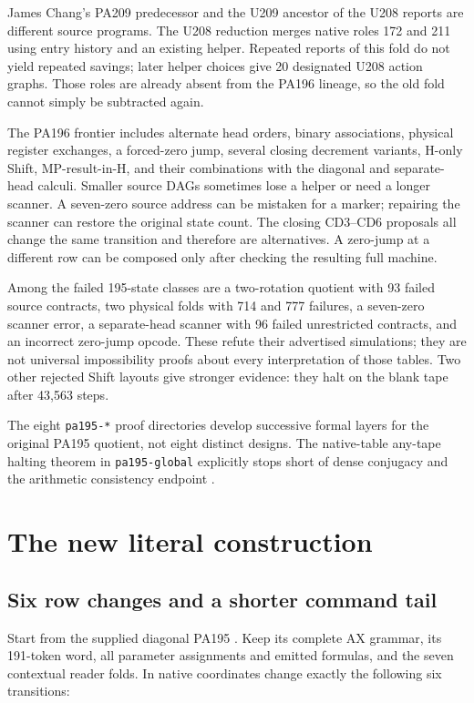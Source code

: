 \documentclass[11pt,letterpaper]{article}
\newcommand{\file}[1]{\texttt{\nolinkurl{#1}}}
\begin{document}
James Chang's PA209 predecessor and the U209 ancestor of the U208 reports
are different source programs. The U208 reduction merges native roles
172 and 211 using entry history and an existing helper. Repeated reports
of this fold do not yield repeated savings; later helper choices give
20 designated U208 action graphs. Those roles are already absent from
the PA196 lineage, so the old fold cannot simply be subtracted again.

The PA196 frontier includes alternate head orders, binary associations,
physical register exchanges, a forced-zero jump, several closing decrement
variants, H-only Shift, MP-result-in-H, and their combinations with the
diagonal and separate-head calculi. Smaller source DAGs sometimes lose a
helper or need a longer scanner. A seven-zero source address can be mistaken
for a marker; repairing the scanner can restore the original state count.
The closing CD3--CD6 proposals all change the same transition and therefore
are alternatives. A zero-jump at a different row can be composed only after
checking the resulting full machine.

Among the failed 195-state classes are a two-rotation quotient with 93 failed
source contracts, two physical folds with 714 and 777 failures, a seven-zero
scanner error, a separate-head scanner with 96 failed unrestricted contracts,
and an incorrect zero-jump opcode. These refute their advertised simulations;
they are not universal impossibility proofs about every interpretation of
those tables. Two other rejected Shift layouts give stronger evidence:
they halt on the blank tape after 43,563 steps.

The eight \file{pa195-*} proof directories develop successive formal layers
for the original PA195 quotient, not eight distinct designs. The native-table
any-tape halting theorem in \file{pa195-global} explicitly stops short of
dense conjugacy and the arithmetic consistency endpoint \cite{formalstatus}.

\section{The new literal construction}
\label{sec:construction}

\subsection{Six row changes and a shorter command tail}

Start from the supplied diagonal PA195 \cite{pa195}. Keep its complete AX
grammar, its 191-token word, all parameter assignments and emitted formulas,
and the seven contextual reader folds. In native coordinates change exactly
the following six transitions:
\end{document}
